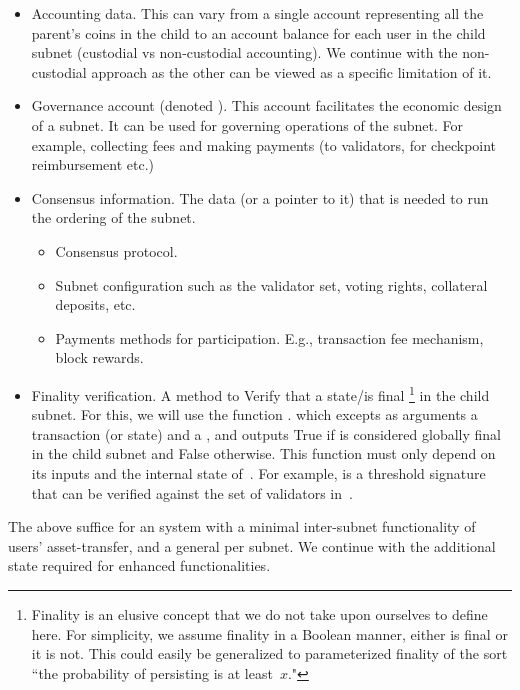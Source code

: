 \begin{itemize}
    \item Accounting data. This can vary from a single account representing all the parent's coins in the child to an account balance for each user in the child subnet (custodial vs non-custodial accounting). We continue with the non-custodial approach as the other can be viewed as a specific limitation of it.
    \item Governance account (denoted \gov). This account facilitates the economic design of a subnet. It can be used for governing operations of the subnet. For example, collecting fees and making payments (to validators, for checkpoint reimbursement etc.) 
    \item Consensus information. The data (or a pointer to it) that is needed to run the ordering of the subnet.
    \begin{itemize}
        \item Consensus protocol.
        \item Subnet configuration such as the validator set, voting rights, collateral deposits, etc.
        \item Payments methods for participation. E.g., transaction fee mechanism, block rewards.
    \end{itemize}
    \item Finality verification. A method to Verify that a state/\tx is final%
    \footnote{Finality is an elusive concept that we do not take upon ourselves to define here. For simplicity, we assume finality in a Boolean manner, either \tx is final or it is not. This could easily be generalized to parameterized finality of the sort ``the probability of \tx persisting is at least~$x$."}
    in the child subnet. For this, we will use the function \sa.\verifyGfinal{\tx}{\prf} which excepts as arguments a transaction (or state) and a \prf, and outputs True if \tx is considered globally final in the child subnet and False otherwise. This function must only depend on its inputs and the internal state of~\sa. For example, \prf is a threshold signature that can be verified against the set of validators in~\sa.
\end{itemize}
%
The above suffice for an \nameFull system with a minimal inter-subnet functionality of users' asset-transfer, and a general \smr per subnet. We continue with the additional state required for enhanced functionalities.
